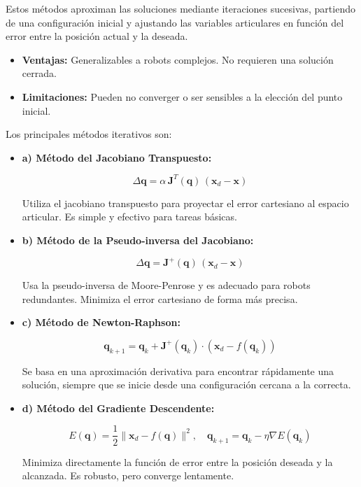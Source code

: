 Estos métodos aproximan las soluciones mediante iteraciones sucesivas, partiendo de una configuración inicial y ajustando las variables articulares en función del error entre la posición actual y la deseada.

\begin{itemize}
	\item \textbf{Ventajas:} Generalizables a robots complejos. No requieren una solución cerrada.
	\item \textbf{Limitaciones:} Pueden no converger o ser sensibles a la elección del punto inicial.
\end{itemize}

Los principales métodos iterativos son:

\begin{itemize}
	\item \textbf{a) Método del Jacobiano Transpuesto:}
	
	\[
	\Delta \mathbf{q} = \alpha \, \mathbf{J}^T(\mathbf{q}) \, (\mathbf{x}_d - \mathbf{x})
	\]
	
	Utiliza el jacobiano transpuesto para proyectar el error cartesiano al espacio articular. Es simple y efectivo para tareas básicas.
	
	\item \textbf{b) Método de la Pseudo-inversa del Jacobiano:}
	
	\[
	\Delta \mathbf{q} = \mathbf{J}^+(\mathbf{q}) \, (\mathbf{x}_d - \mathbf{x})
	\]
	
	Usa la pseudo-inversa de Moore-Penrose y es adecuado para robots redundantes. Minimiza el error cartesiano de forma más precisa.
	
	\item \textbf{c) Método de Newton-Raphson:}
	
	\[
	\mathbf{q}_{k+1} = \mathbf{q}_k + \mathbf{J}^+(\mathbf{q}_k) \cdot (\mathbf{x}_d - f(\mathbf{q}_k))
	\]
	
	Se basa en una aproximación derivativa para encontrar rápidamente una solución, siempre que se inicie desde una configuración cercana a la correcta.
	
	\item \textbf{d) Método del Gradiente Descendente:}
	
	\[
	E(\mathbf{q}) = \frac{1}{2} \| \mathbf{x}_d - f(\mathbf{q}) \|^2, \quad \mathbf{q}_{k+1} = \mathbf{q}_k - \eta \nabla E(\mathbf{q}_k)
	\]
	
	Minimiza directamente la función de error entre la posición deseada y la alcanzada. Es robusto, pero converge lentamente.
\end{itemize}

